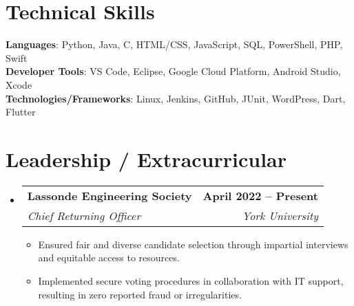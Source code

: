 \documentclass[letterpaper,11pt]{article}
\makeatletter
\newcommand{\resumeItem}[1]{
  \item\small{
    {#1 \vspace{-2pt}}
  }
}
\newcommand{\resumeSubheading}[4]{
  \vspace{-2pt}\item
    \begin{tabular*}{1.0\textwidth}[t]{l@{\extracolsep{\fill}}r}
      \textbf{#1} & \textbf{\small #2} \\
      \textit{\small#3} & \textit{\small #4} \\
    \end{tabular*}\vspace{-7pt}
}
\newcommand{\resumeSubHeadingListStart}{\begin{itemize}[leftmargin=0.0in, label={}]}
\newcommand{\resumeSubHeadingListEnd}{\end{itemize}}
\newcommand{\resumeItemListStart}{\begin{itemize}}
\newcommand{\resumeItemListEnd}{\end{itemize}\vspace{-5pt}}
\makeatother
\begin{document}
\section{Technical Skills}
 \begin{itemize}[leftmargin=0.15in, label={}]
    \small{\item{
     \textbf{Languages}{: Python, Java, C, HTML/CSS, JavaScript, SQL, PowerShell, PHP, Swift} \\
     \textbf{Developer Tools}{: VS Code, Eclipse, Google Cloud Platform, Android Studio, Xcode} \\
     \textbf{Technologies/Frameworks}{: Linux, Jenkins, GitHub, JUnit, WordPress, Dart, Flutter} \\
    }}
 \end{itemize}
 \vspace{-16pt}


\section{Leadership / Extracurricular}
    \resumeSubHeadingListStart
        \resumeSubheading{Lassonde Engineering Society}{April 2022 -- Present}{Chief Returning Officer}{York University}
            \resumeItemListStart
           \resumeItem{Ensured fair and diverse candidate selection through impartial interviews and equitable access to resources.}
             \resumeItem{Implemented secure voting procedures in collaboration with IT support, resulting in zero reported fraud or irregularities.}
            \resumeItemListEnd
        
    \resumeSubHeadingListEnd
\end{document}
